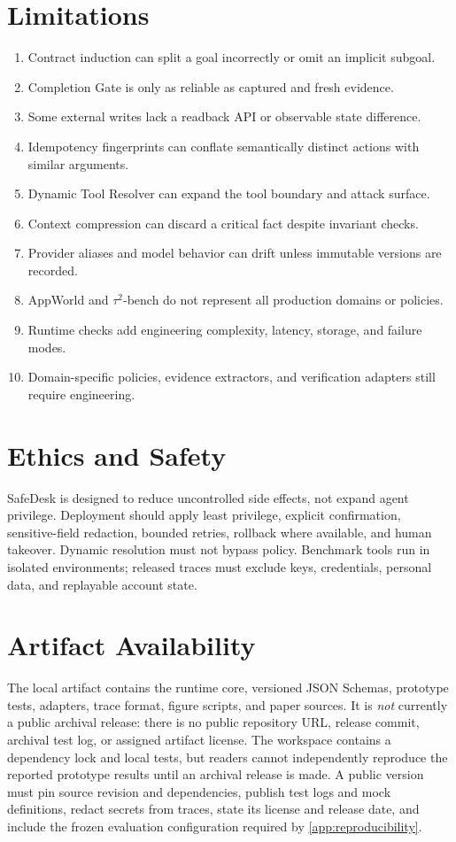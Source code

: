 \documentclass[10pt]{article}
\newcommand{\safedesk}{SafeDesk}
\begin{document}
\section{Limitations}

\begin{enumerate}
  \item Contract induction can split a goal incorrectly or omit an implicit subgoal.
  \item Completion Gate is only as reliable as captured and fresh evidence.
  \item Some external writes lack a readback API or observable state difference.
  \item Idempotency fingerprints can conflate semantically distinct actions with similar arguments.
  \item Dynamic Tool Resolver can expand the tool boundary and attack surface.
  \item Context compression can discard a critical fact despite invariant checks.
  \item Provider aliases and model behavior can drift unless immutable versions are recorded.
  \item AppWorld and $\tau^2$-bench do not represent all production domains or policies.
  \item Runtime checks add engineering complexity, latency, storage, and failure modes.
  \item Domain-specific policies, evidence extractors, and verification adapters still require engineering.
\end{enumerate}

\section{Ethics and Safety}

\safedesk{} is designed to reduce uncontrolled side effects, not expand agent
privilege. Deployment should apply least privilege, explicit confirmation,
sensitive-field redaction, bounded retries, rollback where available, and human
takeover. Dynamic resolution must not bypass policy. Benchmark tools run in
isolated environments; released traces must exclude keys, credentials, personal
data, and replayable account state.

\section{Artifact Availability}

The local artifact contains the runtime core, versioned JSON Schemas, prototype
tests, adapters, trace format, figure scripts, and paper sources. It is \emph{not}
currently a public archival release: there is no public repository URL, release
commit, archival test log, or assigned artifact license. The workspace contains a
dependency lock and local tests, but readers cannot independently reproduce the
reported prototype results until an archival release is made. A public version must
pin source revision and dependencies, publish test logs and mock definitions,
redact secrets from traces, state its license and release date, and include the
frozen evaluation configuration required by \cref{app:reproducibility}.
\end{document}
